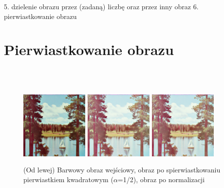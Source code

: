 \documentclass[final,a4paper,openany,12pt]{mwbk}
\begin{document}
5. dzielenie obrazu przez (zadaną) liczbę oraz przez inny obraz
6. pierwiastkowanie obrazu

\section{ Pierwiastkowanie obrazu}

\hfill
\\\\
\indent

\begin{figure}[H]
	\begin{center}
		\includegraphics[width=0.3\textwidth]{1/1Color_Sqrt_Original}
		\includegraphics[width=0.3\textwidth]{1/1Color_Sqrt_Result}
		\includegraphics[width=0.3\textwidth]{1/1Color_Sqrt_Result_Norm}
	\end{center}
	\caption{(Od lewej) Barwowy obraz wejściowy, obraz po spierwiastkowaniu pierwiastkiem kwadratowym ($\alpha$=1/2), obraz po normalizacji }
\end{figure}
\end{document}
